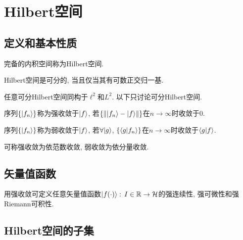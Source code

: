 \chapter{Hilbert空间}

\section{定义和基本性质}

\begin{definition}
    完备的内积空间称为Hilbert空间.
\end{definition}
\begin{theorem}
    Hilbert空间是可分的, 当且仅当其有可数正交归一基.
\end{theorem}
任意可分Hilbert空间同构于$\ell^2$和$L^2$. 以下只讨论可分Hilbert空间.

\begin{definition}
    序列$\{|f_n\rangle\}$称为强收敛于$|f\rangle$, 若$\{\left\lVert|f_n\rangle-|f\rangle\right\rVert\}$在$n\to\infty$时收敛于$0$.
\end{definition}
\begin{definition}
    序列$\{|f_n\rangle\}$称为弱收敛于$|f\rangle$, 若$\forall|g\rangle$, $\{\langle g|f_n\rangle\}$在$n\to\infty$时收敛于$\langle g|f\rangle$.
\end{definition}
可称强收敛为依范数收敛, 弱收敛为依分量收敛.

\section{矢量值函数}

用强收敛可定义任意矢量值函数$|f(\cdot)\rangle:\,I\in\mathbb{R}\to\mathcal{H}$的强连续性, 强可微性和强Riemann可积性.

\section{Hilbert空间的子集}

